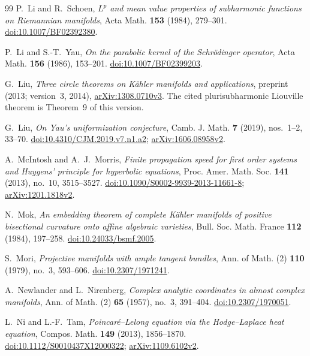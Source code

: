 \documentclass[11pt]{article}
\theoremstyle{definition}
\theoremstyle{remark}
\numberwithin{equation}{section}
\begin{document}
\begin{thebibliography}{99}
P.~Li and R.~Schoen,
\emph{$L^p$ and mean value properties of subharmonic functions on
Riemannian manifolds},
Acta Math. \textbf{153} (1984), 279--301.
\href{https://doi.org/10.1007/BF02392380}{doi:10.1007/BF02392380}.

P.~Li and S.-T.~Yau,
\emph{On the parabolic kernel of the Schr\"odinger operator},
Acta Math. \textbf{156} (1986), 153--201.
\href{https://doi.org/10.1007/BF02399203}{doi:10.1007/BF02399203}.

G.~Liu,
\emph{Three circle theorems on K\"ahler manifolds and applications},
preprint (2013; version~3, 2014),
\href{https://arxiv.org/abs/1308.0710v3}{arXiv:1308.0710v3}.
The cited plurisubharmonic Liouville theorem is Theorem~9 of this version.

G.~Liu,
\emph{On Yau's uniformization conjecture},
Camb. J. Math. \textbf{7} (2019), nos.~1--2, 33--70.
\href{https://doi.org/10.4310/CJM.2019.v7.n1.a2}
{doi:10.4310/CJM.2019.v7.n1.a2};
\href{https://arxiv.org/abs/1606.08958v2}{arXiv:1606.08958v2}.

A.~McIntosh and A.~J.~Morris,
\emph{Finite propagation speed for first order systems and Huygens'
principle for hyperbolic equations},
Proc. Amer. Math. Soc. \textbf{141} (2013), no.~10, 3515--3527.
\href{https://doi.org/10.1090/S0002-9939-2013-11661-8}
{doi:10.1090/S0002-9939-2013-11661-8};
\href{https://arxiv.org/abs/1201.1818v2}{arXiv:1201.1818v2}.

N.~Mok,
\emph{An embedding theorem of complete K\"ahler manifolds of positive
bisectional curvature onto affine algebraic varieties},
Bull. Soc. Math. France \textbf{112} (1984), 197--258.
\href{https://doi.org/10.24033/bsmf.2005}{doi:10.24033/bsmf.2005}.

S.~Mori,
\emph{Projective manifolds with ample tangent bundles},
Ann. of Math. (2) \textbf{110} (1979), no.~3, 593--606.
\href{https://doi.org/10.2307/1971241}{doi:10.2307/1971241}.

A.~Newlander and L.~Nirenberg,
\emph{Complex analytic coordinates in almost complex manifolds},
Ann. of Math. (2) \textbf{65} (1957), no.~3, 391--404.
\href{https://doi.org/10.2307/1970051}{doi:10.2307/1970051}.

L.~Ni and L.-F.~Tam,
\emph{Poincar\'e--Lelong equation via the Hodge--Laplace heat equation},
Compos. Math. \textbf{149} (2013), 1856--1870.
\href{https://doi.org/10.1112/S0010437X12000322}
{doi:10.1112/S0010437X12000322};
\href{https://arxiv.org/abs/1109.6102v2}{arXiv:1109.6102v2}.


\end{thebibliography}
\end{document}
